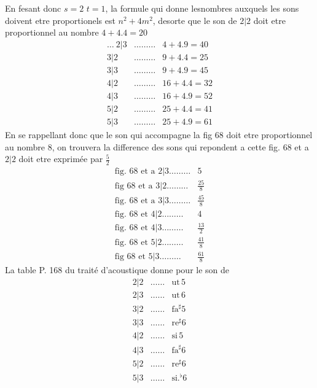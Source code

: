 \documentclass[11pt,a4paper]{article}
\begin{document}
En fesant donc $s=2$ $t=1$, la formule qui donne lesnombres auxquels
les sons doivent etre proportionels est $n^{2}+4m^{2}$, desorte que le son
de $2|2$ doit etre proportionnel au nombre $4+4.4=20$
\[ \begin{array}{lcr}
\ldots\ 2|3 & \ldots\ldots\ldots & 4+4.9=40 \\
3|2 & \ldots\ldots\ldots & 9+4.4=25 \\
3|3 & \ldots\ldots\ldots & 9+4.9=45 \\
4|2 & \ldots\ldots\ldots & 16+4.4=32 \\
4|3 & \ldots\ldots\ldots & 16+4.9=52 \\
5|2 & \ldots\ldots\ldots & 25+4.4=41 \\
5|3 & \ldots\ldots\ldots & 25+4.9=61
\end{array} \]
En se rappellant donc que le son qui accompagne la fig 68 doit
etre proportionnel au nombre 8, on trouvera  la difference
des sons qui repondent a cette fig. 68 et a $2|2$ doit etre exprimée par $\frac{5}{2}$
\[ \begin{array}{ll}
\text{fig. 68 et a } 2|3 \ldots\ldots\ldots & 5 \\[2pt]
\text{fig 68 et a } 3|2 \ldots\ldots\ldots & \frac{25}{8} \\[4pt]
\text{fig. 68 et a } 3|3 \ldots\ldots\ldots & \frac{45}{8} \\[4pt]
\text{fig. 68 et } 4|2 \ldots\ldots\ldots & 4 \\[2pt]
\text{fig. 68 et } 4|3 \ldots\ldots\ldots & \frac{13}{2} \\[4pt]
\text{fig. 68 et } 5|2 \ldots\ldots\ldots & \frac{41}{8} \\[4pt]
\text{fig 68 et } 5|3 \ldots\ldots\ldots & \frac{61}{8}
\end{array} \]
La table P. 168 du traité d'acoustique donne
pour le son de
\[ \begin{array}{lll}
2|2 & \ldots\ldots & \text{ut}\,5 \\
2|3 & \ldots\ldots & \text{ut}\,6 \\
3|2 & \ldots\ldots & \text{fa}^{\sharp}5 \\
3|3 & \ldots\ldots & \text{re}^{\sharp}6 \\
4|2 & \ldots\ldots & \text{si}\,5 \\
4|3 & \ldots\ldots & \text{fa}^{\sharp}6 \\
5|2 & \ldots\ldots & \text{re}^{\sharp}6 \\
5|3 & \ldots\ldots & \text{si}.^{\flat}6
\end{array} \]
\end{document}
